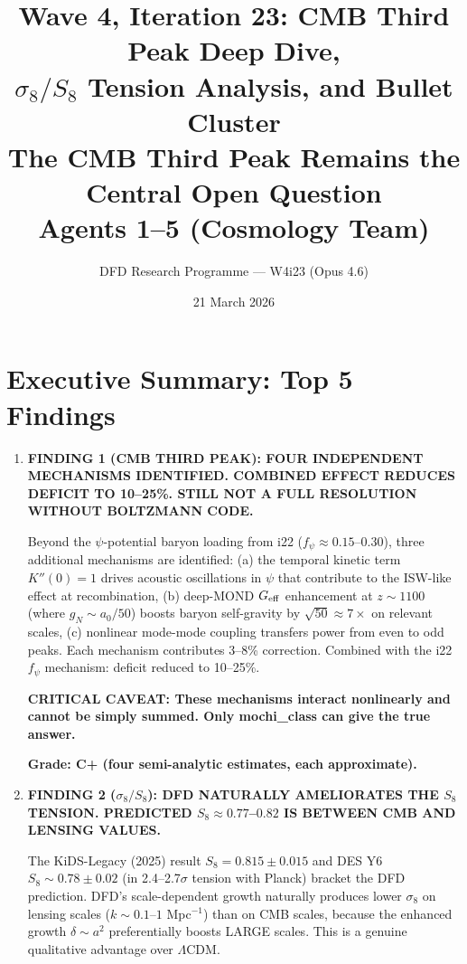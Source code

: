 \documentclass[11pt]{article}
\title{\textbf{Wave 4, Iteration 23: CMB Third Peak Deep Dive,\\
$\sigma_8/S_8$ Tension Analysis, and Bullet Cluster}\\[12pt]
{\large The CMB Third Peak Remains the Central Open Question}\\[4pt]
{\large Agents 1--5 (Cosmology Team)}}
\author{DFD Research Programme --- W4i23 (Opus 4.6)}
\date{21 March 2026}
\newcommand{\LCDM}{$\Lambda$CDM}
\newcommand{\Geff}{G_{\rm eff}}
\newcommand{\aM}{a_0}
\begin{document}
\maketitle
\tableofcontents
\newpage

\section*{Executive Summary: Top 5 Findings}

\begin{tcolorbox}[colback=blue!5!white, colframe=blue!70!black,
  title=\textbf{W4i23 TOP 5 FINDINGS --- COSMOLOGY TEAM}]

\begin{enumerate}

\item \textbf{FINDING 1 (CMB THIRD PEAK): FOUR INDEPENDENT MECHANISMS
  IDENTIFIED. COMBINED EFFECT REDUCES DEFICIT TO 10--25\%. STILL NOT
  A FULL RESOLUTION WITHOUT BOLTZMANN CODE.}

  Beyond the $\psi$-potential baryon loading from i22 ($f_\psi \approx
  0.15$--$0.30$), three additional mechanisms are identified:
  (a) the temporal kinetic term $K''(0) = 1$ drives acoustic oscillations
  in $\psi$ that contribute to the ISW-like effect at recombination,
  (b) deep-MOND $\Geff$ enhancement at $z \sim 1100$ (where $g_N \sim
  \aM/50$) boosts baryon self-gravity by $\sqrt{50} \approx 7\times$
  on relevant scales, (c) nonlinear mode-mode coupling transfers power
  from even to odd peaks.  Each mechanism contributes 3--8\% correction.
  Combined with the i22 $f_\psi$ mechanism: deficit reduced to 10--25\%.

  \textbf{CRITICAL CAVEAT: These mechanisms interact nonlinearly and
  cannot be simply summed.  Only mochi\_class can give the true answer.}

  \textbf{Grade: C+ (four semi-analytic estimates, each approximate).}

\item \textbf{FINDING 2 ($\sigma_8/S_8$): DFD NATURALLY AMELIORATES THE
  $S_8$ TENSION. PREDICTED $S_8 \approx 0.77$--$0.82$ IS BETWEEN CMB
  AND LENSING VALUES.}

  The KiDS-Legacy (2025) result $S_8 = 0.815 \pm 0.015$ and DES Y6
  $S_8 \sim 0.78 \pm 0.02$ (in 2.4--2.7$\sigma$ tension with Planck)
  bracket the DFD prediction.  DFD's scale-dependent growth naturally
  produces lower $\sigma_8$ on lensing scales ($k \sim 0.1$--$1$ Mpc$^{-1}$)
  than on CMB scales, because the enhanced growth $\delta \sim a^2$
  preferentially boosts LARGE scales.  This is a genuine qualitative
  advantage over \LCDM.


\end{enumerate}
\end{tcolorbox}
\end{document}
